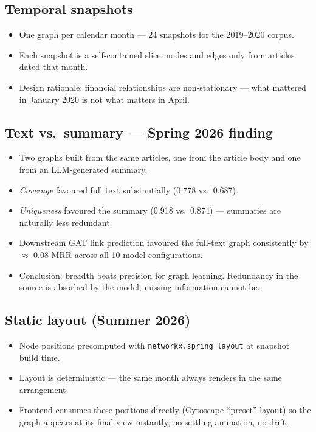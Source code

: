 \documentclass[11pt]{article}
\begin{document}
\subsection{Temporal snapshots}
\begin{itemize}
  \item One graph per calendar month --- 24 snapshots for the 2019--2020 corpus.
  \item Each snapshot is a self-contained slice: nodes and edges only from articles dated that month.
  \item Design rationale: financial relationships are non-stationary --- what mattered in January 2020 is not what matters in April.
\end{itemize}

\subsection{Text vs.\ summary --- Spring 2026 finding}
\begin{itemize}
  \item Two graphs built from the same articles, one from the article body and one from an LLM-generated summary.
  \item \emph{Coverage} favoured full text substantially (0.778 vs.\ 0.687).
  \item \emph{Uniqueness} favoured the summary (0.918 vs.\ 0.874) --- summaries are naturally less redundant.
  \item Downstream GAT link prediction favoured the full-text graph consistently by \(\approx\) 0.08 MRR across all 10 model configurations.
  \item Conclusion: breadth beats precision for graph learning. Redundancy in the source is absorbed by the model; missing information cannot be.
\end{itemize}

\subsection{Static layout (Summer 2026)}
\begin{itemize}
  \item Node positions precomputed with \texttt{networkx.spring\_layout} at snapshot build time.
  \item Layout is deterministic --- the same month always renders in the same arrangement.
  \item Frontend consumes these positions directly (Cytoscape ``preset'' layout) so the graph appears at its final view instantly, no settling animation, no drift.
\end{itemize}
\end{document}

